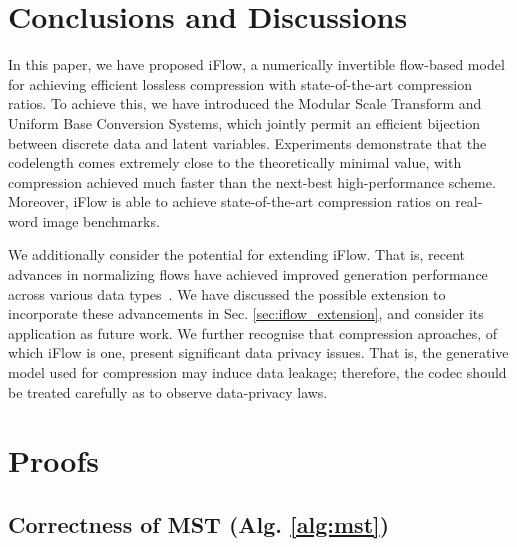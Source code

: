 \documentclass{article}
\begin{document}
\vspace{-3pt}
\section{Conclusions and Discussions}
\vspace{-3pt}
\label{sec:conclusion}

In this paper, we have proposed iFlow, a numerically invertible flow-based model for achieving efficient lossless compression with state-of-the-art compression ratios. To achieve this, we have introduced the Modular Scale Transform and Uniform Base Conversion Systems, which jointly permit an efficient bijection between discrete data and latent variables. 
Experiments demonstrate that the codelength comes extremely close to the theoretically minimal value, with compression achieved much faster than the next-best high-performance scheme. 
Moreover, iFlow is able to achieve state-of-the-art compression ratios on real-word image benchmarks.

We additionally consider the potential for extending iFlow. That is, recent advances in normalizing flows have achieved improved generation performance across various data types~\cite{lippe2020categorical,chen2020vflow,kim2020softflow}. We have discussed the possible extension to incorporate these advancements in Sec. \ref{sec:iflow_extension}, and consider its application as future work. We further recognise that compression aproaches, of which iFlow is one, present significant data privacy issues. That is, the generative model used for compression may induce data leakage; therefore, the codec should be treated carefully as to observe data-privacy laws. 






{\small


}






\newpage

\appendix

\section{Proofs}

\subsection{Correctness of MST (Alg. \ref{alg:mst})}
\end{document}
